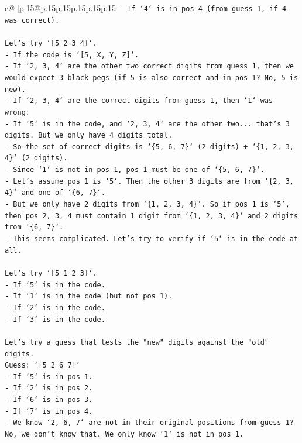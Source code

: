 \documentclass{article}
\begin{document}
{\begin{supertabular}{c@{$\;$}|p{.15\linewidth}@{}p{.15\linewidth}p{.15\linewidth}p{.15\linewidth}p{.15\linewidth}p{.15\linewidth}}
{{{\texttt{{-} If `4` is in pos 4 (from guess 1, if 4 was correct).} \\
\\ 
\texttt{Let's try `{[}5 2 3 4{]}`.} \\
\texttt{{-} If the code is `{[}5, X, Y, Z{]}`.} \\
\texttt{{-} If `2, 3, 4` are the other two correct digits from guess 1, then we would expect 3 black pegs (if 5 is also correct and in pos 1? No, 5 is new).} \\
\texttt{{-} If `2, 3, 4` are the correct digits from guess 1, then `1` was wrong.} \\
\texttt{{-} If `5` is in the code, and `2, 3, 4` are the other two... that's 3 digits. But we only have 4 digits total.} \\
\texttt{{-} So the set of correct digits is `\{5, 6, 7\}` (2 digits) + `\{1, 2, 3, 4\}` (2 digits).} \\
\texttt{{-} Since `1` is not in pos 1, pos 1 must be one of `\{5, 6, 7\}`.} \\
\texttt{{-} Let's assume pos 1 is `5`. Then the other 3 digits are from `\{2, 3, 4\}` and one of `\{6, 7\}`.} \\
\texttt{{-} But we only have 2 digits from `\{1, 2, 3, 4\}`. So if pos 1 is `5`, then pos 2, 3, 4 must contain 1 digit from `\{1, 2, 3, 4\}` and 2 digits from `\{6, 7\}`.} \\
\texttt{{-} This seems complicated. Let's try to verify if `5` is in the code at all.} \\
\\ 
\texttt{Let's try `{[}5 1 2 3{]}`.} \\
\texttt{{-} If `5` is in the code.} \\
\texttt{{-} If `1` is in the code (but not pos 1).} \\
\texttt{{-} If `2` is in the code.} \\
\texttt{{-} If `3` is in the code.} \\
\\ 
\texttt{Let's try a guess that tests the "new" digits against the "old" digits.} \\
\texttt{Guess: `{[}5 2 6 7{]}`} \\
\texttt{{-} If `5` is in pos 1.} \\
\texttt{{-} If `2` is in pos 2.} \\
\texttt{{-} If `6` is in pos 3.} \\
\texttt{{-} If `7` is in pos 4.} \\
\texttt{{-} We know `2, 6, 7` are not in their original positions from guess 1? No, we don't know that. We only know `1` is not in pos 1.} \\
}}}
\end{supertabular}}
\end{document}
